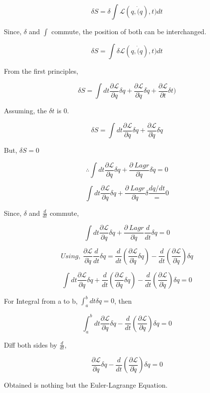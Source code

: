 \documentclass[a4paper]{article}
\newcommand{\Lagr}{\mathcal{L}}
\newcommand{\ddt}{\frac{d}{dt}}
\begin{document}
		$$ \delta S = \delta \int \Lagr(q, \dot(q), t) dt $$

		Since, $\delta$ and $\int$ commute, the position of both can be interchanged.

		$$ \delta S = \int \delta \Lagr(q, \dot(q), t) dt $$

		From the first principles,

		$$ \delta S = \int dt \frac{\partial\Lagr}{\partial q}\delta q + \frac{\partial\Lagr}{\partial\dot{q}}\delta \dot{q} + \frac{\partial\Lagr}{\partial t}\delta t) $$

		Assuming, the $\delta t$ is $0$.

		$$ \delta S = \int dt \frac{\partial\Lagr}{\partial q}\delta q + \frac{\partial\Lagr}{\partial\dot{q}}\delta \dot{q} $$

		But, $\delta S = 0$

		$$ \therefore \int dt \frac{\partial\Lagr}{\partial q}\delta q + \frac{\partial\ Lagr}{\partial\dot{q}}\delta \dot{q} = 0 $$

		$$ \int dt \frac{\partial\Lagr}{\partial q}\delta q + \frac{\partial\ Lagr}{\partial\dot{q}}\delta \frac{dq/dt} = 0 $$
		
		Since, $\delta$ and $\frac{d}{dt}$ commute,

		$$ \int dt \frac{\partial\Lagr}{\partial q}\delta q + \frac{\partial\ Lagr}{\partial\dot{q}}\ddt\delta q = 0 $$

		$$Using,\ \frac{\partial\Lagr}{\partial \dot{q}}\frac{d}{dt}\delta q = \ddt(\frac{\partial\Lagr}{\partial\dot{q}}\delta q) - \ddt(\frac{\partial\Lagr}{\partial\dot{q}}) \delta q $$

		$$ \int dt \frac{\partial\Lagr}{\partial q}\delta q + \ddt(\frac{\partial\Lagr}{\partial\dot{q}}\delta q) - \ddt(\frac{\partial\Lagr}{\partial\dot{q}}) \delta q = 0 $$

		For Integral from a to b, $\int_a^b dt \delta q = 0$, then

		$$ \int_a^b dt \frac{\partial\Lagr}{\partial q}\delta q - \ddt(\frac{\partial\Lagr}{\partial\dot{q}}) \delta q = 0 $$
		
		Diff both sides by $\ddt$,

		\begin{equation}
			\frac{\partial\Lagr}{\partial q}\delta q - \ddt(\frac{\partial\Lagr}{\partial\dot{q}}) \delta q = 0 \label{eq_E-L}
		\end{equation}

		Obtained is nothing but the Euler-Lagrange Equation.
		
\end{document}
